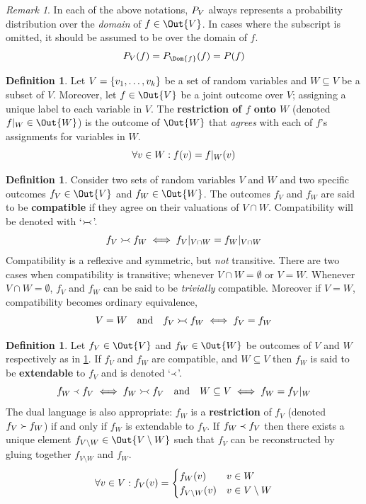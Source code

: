 \documentclass[aps, 10pt, english, twoside, pra, nofootinbib, longbibliography]{revtex4-1}
\theoremstyle{plain}
\theoremstyle{definition}
\newtheorem{definition}[theorem]{Definition}
\theoremstyle{remark}
\newtheorem{remark}[theorem]{Remark}
\newcommand{\com}{\mathrel{\Yright\hspace{-0.2em}\Yleft}}
\newcommand{\ext}{\mathrel{\Yleft}}
\newcommand{\res}{\mathrel{\Yright}}
\newcommand{\term}[1]{\textcolor{Mahogany}{\textbf{#1}}}
\begin{document}
    \begin{remark}
        \label{rem:domain_dist}
        In each of the above notations, $\prob[V]$ always represents a probability distribution over the \textit{domain} of $f \in \Out{V}$. In cases where the subscript is omitted, it should be assumed to be over the domain of $f$.
        \[ \prob[V][f] = \prob[\Dom{f}][f] = \prob[][f] \]
    \end{remark}

    \begin{definition}
        \label{def:restriction}
        Let $V = \bc{v_1, \ldots, v_k}$ be a set of random variables and $W \subseteq V$ be a subset of $V$. Moreover, let $f \in \Out{V}$ be a joint outcome over $V$; assigning a unique label to each variable in $V$. The \term{restriction of $f$ onto $W$} (denoted $f|_{W} \in \Out{W}$) is the outcome of $\Out{W}$ that \textit{agrees} with each of $f$'s assignments for variables in $W$.
        \[ \forall v \in W : f\br{v} = f|_{W}\br{v} \]
    \end{definition}

    \begin{definition}
        \label{def:outcome_compatible}
        Consider two sets of random variables $V$ and $W$ and two specific outcomes $f_V \in \Out{V}$ and $f_W \in \Out{W}$. The outcomes $f_V$ and $f_W$ are said to be \term{compatible} if they agree on their valuations of $V \cap W$. Compatibility will be denoted with `$\com$'.
        \[ f_V \com f_W \iff {f_V}|_{V\cap W} = {f_W}|_{V\cap W} \]
        Compatibility is a reflexive and symmetric, but \textit{not} transitive. There are two cases when compatibility is transitive; whenever $V \cap W = \emptyset$ or $V = W$. Whenever $V \cap W = \emptyset$, $f_V$ and $f_W$ can be said to be \textit{trivially} compatible. Moreover if $V = W$, compatibility becomes ordinary equivalence,
        \[ V = W \quad \textrm{and} \quad f_V \com f_W \iff f_V = f_W \]
    \end{definition}

    \begin{definition}
        \label{def:extendable}
        Let $f_V \in \Out{V}$ and $f_W \in \Out{W}$ be outcomes of $V$ and $W$ respectively as in \cref{def:outcome_compatible}. If $f_V$ and $f_W$ are compatible, and $W \subseteq V$ then $f_W$ is said to be \term{extendable} to $f_V$ and is denoted `$\ext$'.
        \[ f_W \ext f_V \iff f_W \com f_V \quad \textrm{and} \quad W \subseteq V \iff {f_W} = {f_V}|_{W} \]
        The dual language is also appropriate: $f_W$ is a \term{restriction} of $f_V$ (denoted $f_V \res f_W$) if and only if $f_W$ is extendable to $f_V$. If $f_W \ext f_V$ then there exists a unique element $f_{V \setminus W} \in \Out{V \setminus W}$ such that $f_V$ can be reconstructed by gluing together $f_{V \setminus W}$ and $f_W$.
        \[ \forall v \in V : f_V\br{v} = \begin{cases}
            f_W\br{v} & v \in W \\
            f_{V\setminus W}\br{v} & v \in V \setminus W
        \end{cases}  \]
    \end{definition}
\end{document}
